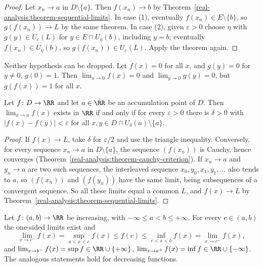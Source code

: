 \begin{proof}
Let $x_n \to a$ in $D \setminus \{a\}$. Then $f(x_n) \to b$ by Theorem~\ref{real-analysis:theorem-sequential-limits}. In case (1), eventually $f(x_n) \in E \setminus \{b\}$, so $g(f(x_n)) \to L$ by the same theorem. In
case (2), given $\varepsilon > 0$ choose $\eta$ with $g(y) \in U_\varepsilon(L)$ for $y \in E \cap U_\eta(b)$, including $y = b$; eventually $f(x_n) \in U_\eta(b)$, so $g(f(x_n)) \in U_\varepsilon(L)$. Apply the theorem again.
\end{proof}

\begin{counterexample}\label{real-analysis:counterexample-composite}
Neither hypothesis can be dropped. Let $f(x) = 0$ for all $x$, and $g(y) = 0$ for $y \neq 0$, $g(0) = 1$. Then $\lim_{x \to 0}f(x) = 0$ and $\lim_{y \to 0}g(y) = 0$, but $g(f(x)) = 1$ for all $x$.
\end{counterexample}

\begin{proposition}\label{real-analysis:proposition-cauchy-functions}
Let $f \colon D \to \RR$ and let $a \in \bar{\RR}$ be an accumulation point of $D$. Then $\lim_{x \to a}f(x)$ exists in $\RR$ if and only if for every $\varepsilon > 0$ there is $\delta > 0$ with
$|f(x) - f(y)| < \varepsilon$ for all $x, y \in D \cap U_\delta(a) \setminus \{a\}$.
\end{proposition}

\begin{proof}
If $f(x) \to L$, take $\delta$ for $\varepsilon/2$ and use the triangle inequality. Conversely, for every sequence $x_n \to a$ in $D \setminus \{a\}$, the sequence $(f(x_n))$ is Cauchy, hence converges
(Theorem~\ref{real-analysis:theorem-cauchy-criterion}). If $x_n \to a$ and $y_n \to a$ are two such sequences, the interleaved sequence $x_0, y_0, x_1, y_1, \ldots$ also tends to $a$, so $(f(x_n))$ and $(f(y_n))$ have the
same limit, being subsequences of a convergent sequence. So all these limits equal a common $L$, and $f(x) \to L$ by Theorem~\ref{real-analysis:theorem-sequential-limits}.
\end{proof}

\begin{proposition}\label{real-analysis:proposition-monotone-limits}
Let $f \colon (a, b) \to \RR$ be increasing, with $-\infty \leq a < b \leq +\infty$. For every $c \in (a, b)$ the one-sided limits exist and
\[
\lim_{x \to c^-}f(x) = \sup_{a < x < c}f(x) \leq f(c) \leq \inf_{c < x < b}f(x) = \lim_{x \to c^+}f(x),
\]
and $\lim_{x \to b^-}f(x) = \sup f \in \RR \cup \{+\infty\}$, $\lim_{x \to a^+}f(x) = \inf f \in \RR \cup \{-\infty\}$. The analogous statements hold for decreasing functions.
\end{proposition}

